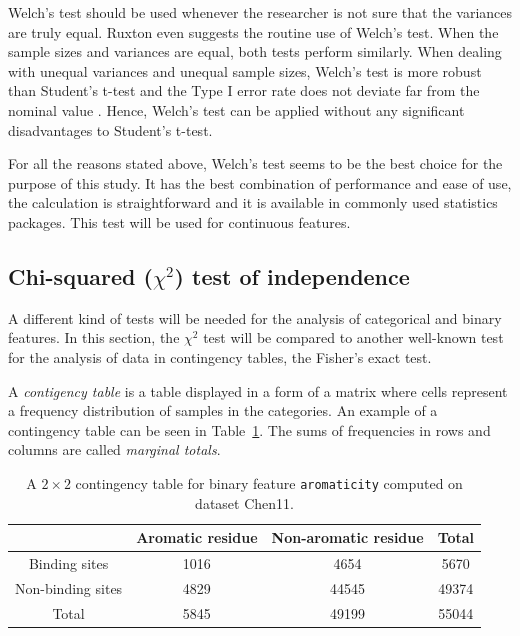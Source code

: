 Welch's test should be used whenever the researcher is not sure that the variances are truly equal. Ruxton \cite{ruxton} even suggests the routine use of Welch's test. When the sample sizes and variances are equal, both tests perform similarly. When dealing with unequal variances and unequal sample sizes, Welch's test is more robust than Student's t-test and the Type I error rate does not deviate far from the nominal value \cite{derrick}. Hence, Welch's test can be applied without any significant disadvantages to Student's t-test.

For all the reasons stated above, Welch's test seems to be the best choice for the purpose of this study. It has the best combination of performance and ease of use, the calculation is straightforward and it is available in commonly used statistics packages. This test will be used for continuous features.

\subsection{Chi-squared ($\chi^{2}$) test of independence}

A different kind of tests will be needed for the analysis of categorical and binary features. In this section, the $\chi^{2}$ test will be compared to another well-known test for the analysis of data in contingency tables, the Fisher's exact test.

A \textit{contigency table} is a table displayed in a form of a matrix where cells represent a frequency distribution of samples in the categories. An example of a contingency table can be seen in Table~\ref{tab:contingency_table_example}. The sums of frequencies in rows and columns are called \textit{marginal totals}.

\begin{table}[!htbp]
\centering
\renewcommand{\arraystretch}{1.5}
 \begin{tabular}{|c|c|c||c|} 
 \hline
  & Aromatic residue & Non-aromatic residue & Total \\ [0.5ex] 
 \hline
 Binding sites & 1016 & 4654 & 5670 \\ 
 \hline
 Non-binding sites & 4829 & 44545 & 49374 \\
 \hline\hline
 Total & 5845 & 49199 & 55044 \\
 \hline
\end{tabular}
\caption{A $2\times 2$ contingency table for binary feature \texttt{aromaticity} computed on dataset Chen11.}\label{tab:contingency_table_example}
\end{table}


